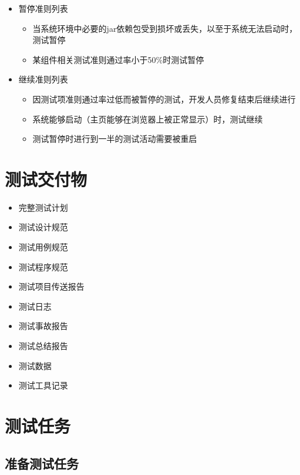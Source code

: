 \documentclass[hyperref, a4paper]{ctexart}
\providecommand{\tightlist}{%
  \setlength{\itemsep}{0pt}\setlength{\parskip}{0pt}}
\begin{document}
\begin{itemize}
\tightlist
\item
  暂停准则列表

  \begin{itemize}
  \tightlist
  \item
    当系统环境中必要的jar依赖包受到损坏或丢失，以至于系统无法启动时，测试暂停
  \item
    某组件相关测试准则通过率小于50\%时测试暂停
  \end{itemize}
\item
  继续准则列表

  \begin{itemize}
  \tightlist
  \item
    因测试项准则通过率过低而被暂停的测试，开发人员修复结束后继续进行
  \item
    系统能够启动（主页能够在浏览器上被正常显示）时，测试继续
  \item
    测试暂停时进行到一半的测试活动需要被重启
  \end{itemize}
\end{itemize}

\hypertarget{ux6d4bux8bd5ux4ea4ux4ed8ux7269}{%
\section{测试交付物}\label{ux6d4bux8bd5ux4ea4ux4ed8ux7269}}

\begin{itemize}
\tightlist
\item
  完整测试计划
\item
  测试设计规范
\item
  测试用例规范
\item
  测试程序规范
\item
  测试项目传送报告
\item
  测试日志
\item
  测试事故报告
\item
  测试总结报告
\item
  测试数据
\item
  测试工具记录
\end{itemize}

\hypertarget{ux6d4bux8bd5ux4efbux52a1}{%
\section{测试任务}\label{ux6d4bux8bd5ux4efbux52a1}}

\hypertarget{ux51c6ux5907ux6d4bux8bd5ux4efbux52a1}{%
\subsection{准备测试任务}\label{ux51c6ux5907ux6d4bux8bd5ux4efbux52a1}}
\end{document}
